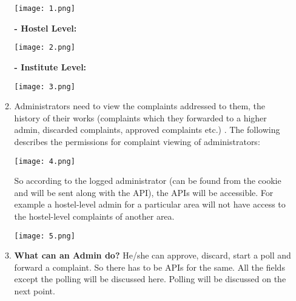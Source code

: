 \documentclass{article}
\begin{document}
\begin{itemize}
\begin{enumerate}
\begin{minipage}{\linewidth}
	        \centering
	        \texttt{[image: 1.png]}
	      
            \end{minipage}
\newline
\newline
\textbf{-	Hostel Level:}
\newline
\begin{minipage}{\linewidth}
	        \centering
	        \texttt{[image: 2.png]}
	        
            \end{minipage}
\newline
\textbf{-	Institute Level:}
\newline
\begin{minipage}{\linewidth}
	        \centering
	        \texttt{[image: 3.png]}
            \end{minipage}
\item Administrators need to view the complaints addressed to them, the history of their works (complaints which they forwarded to a higher admin, discarded complaints, approved complaints etc.)  . The following describes the permissions for complaint viewing of administrators:
\newline
\begin{minipage}{\linewidth}
	        \centering
	        \texttt{[image: 4.png]}
            \end{minipage}
            \newline
            So according to the logged administrator (can be found from the cookie and will be sent along with the API), the APIs will be accessible. For example a hostel-level admin for a particular area will not have access to the hostel-level complaints of another area.
\newline
            
\begin{minipage}{\linewidth}
	        \centering
	        \texttt{[image: 5.png]}
            \end{minipage}
            \newline
            
\item \textbf{What can an Admin do?} He/she can approve, discard, start a poll and forward a complaint. So there has to be APIs for the same. All the fields except the polling will be discussed here. Polling will be discussed on the next point. 
\newline
            

\end{enumerate}
\end{itemize}
\end{document}
